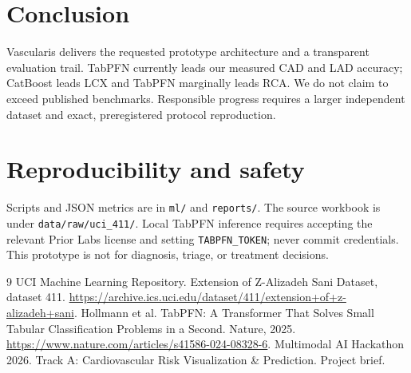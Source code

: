 \documentclass[9pt,twocolumn]{article}
\begin{document}
\section{Conclusion}
Vascularis delivers the requested prototype architecture and a transparent evaluation trail. TabPFN currently leads our measured CAD and LAD accuracy; CatBoost leads LCX and TabPFN marginally leads RCA. We do not claim to exceed published benchmarks. Responsible progress requires a larger independent dataset and exact, preregistered protocol reproduction.
\section*{Reproducibility and safety}
Scripts and JSON metrics are in \texttt{ml/} and \texttt{reports/}. The source workbook is under \texttt{data/raw/uci\_411/}. Local TabPFN inference requires accepting the relevant Prior Labs license and setting \texttt{TABPFN\_TOKEN}; never commit credentials. This prototype is not for diagnosis, triage, or treatment decisions.
\begin{thebibliography}{9}\small
{} UCI Machine Learning Repository. Extension of Z-Alizadeh Sani Dataset, dataset 411. \url{https://archive.ics.uci.edu/dataset/411/extension+of+z-alizadeh+sani}.
 Hollmann et al. TabPFN: A Transformer That Solves Small Tabular Classification Problems in a Second. Nature, 2025. \url{https://www.nature.com/articles/s41586-024-08328-6}.
 Multimodal AI Hackathon 2026. Track A: Cardiovascular Risk Visualization \& Prediction. Project brief.
\end{thebibliography}
\end{document}
